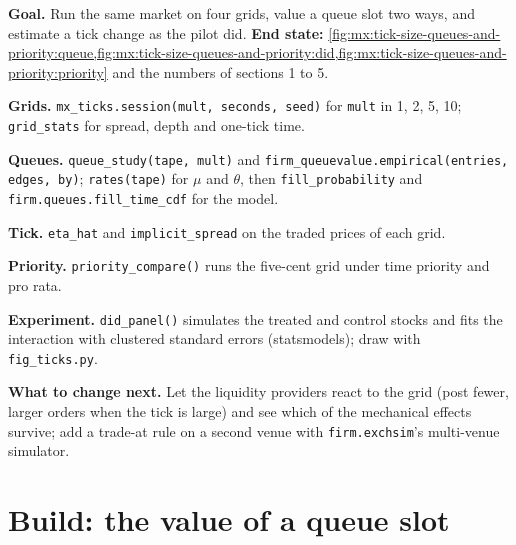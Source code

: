 \begin{tutorial}
\textbf{Goal.} Run the same market on four grids, value a queue slot two ways, and estimate a tick change as the pilot did.
\textbf{End state:} \cref{fig:mx:tick-size-queues-and-priority:queue,fig:mx:tick-size-queues-and-priority:did,fig:mx:tick-size-queues-and-priority:priority}
and the numbers of sections 1 to 5.
\begin{tutsteps}
\item \textbf{Grids.} \texttt{mx\_ticks.session(mult, seconds, seed)} for \texttt{mult} in 1, 2, 5, 10; \texttt{grid\_stats} for spread, depth and
one-tick time.
\item \textbf{Queues.} \texttt{queue\_study(tape, mult)} and \texttt{firm\_queuevalue.empirical(entries, edges, by)}; \texttt{rates(tape)} for $\mu$
and $\theta$, then \texttt{fill\_probability} and \texttt{firm.queues.fill\_time\_cdf} for the model.
\item \textbf{Tick.} \texttt{eta\_hat} and \texttt{implicit\_spread} on the traded prices of each grid.
\item \textbf{Priority.} \texttt{priority\_compare()} runs the five-cent grid under time priority and pro rata.
\item \textbf{Experiment.} \texttt{did\_panel()} simulates the treated and control stocks and fits the interaction with clustered standard errors
(statsmodels); draw with \texttt{fig\_ticks.py}.
\end{tutsteps}
\textbf{What to change next.} Let the liquidity providers react to the grid (post fewer, larger orders when the tick is large) and see which of the
mechanical effects survive; add a trade-at rule on a second venue with \texttt{firm.exchsim}'s multi-venue simulator.
\end{tutorial}

\section{Build: the value of a queue slot}\label{bld:mx:tick-size-queues-and-priority:queuevalue}

